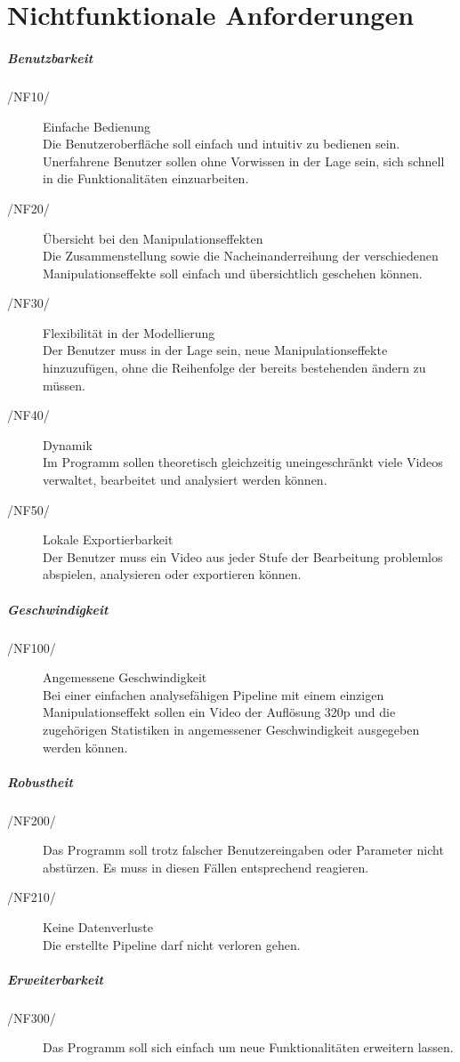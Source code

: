 \section{Nichtfunktionale Anforderungen}

\subparagraph{Benutzbarkeit}
\begin{description}
	\item[/NF10/] Einfache Bedienung \\ Die Benutzeroberfläche soll einfach und intuitiv zu bedienen sein. Unerfahrene Benutzer sollen ohne Vorwissen in der Lage sein, sich schnell in die Funktionalitäten einzuarbeiten.
	\item[/NF20/] Übersicht bei den Manipulationseffekten \\ Die Zusammenstellung sowie die Nacheinanderreihung der verschiedenen Manipulationseffekte soll einfach und übersichtlich geschehen können. 
	\item[/NF30/] Flexibilität in der Modellierung \\ Der Benutzer muss in der Lage sein, neue Manipulationseffekte hinzuzufügen, ohne die Reihenfolge der bereits bestehenden ändern zu müssen.
	\item[/NF40/] Dynamik \\ Im Programm sollen theoretisch gleichzeitig uneingeschränkt viele Videos verwaltet, bearbeitet und analysiert werden können.
	\item[/NF50/] Lokale Exportierbarkeit  \\ Der Benutzer muss ein Video aus jeder Stufe der Bearbeitung problemlos abspielen, analysieren oder exportieren können.
\end{description}

\subparagraph{Geschwindigkeit}

\begin{description}
	\item[/NF100/] Angemessene Geschwindigkeit \\ Bei einer einfachen analysefähigen Pipeline mit einem einzigen Manipulationseffekt sollen ein Video der Auflösung 320p und die zugehörigen Statistiken in angemessener Geschwindigkeit
 ausgegeben werden können.
\end{description}

\subparagraph{Robustheit}

\begin{description}
	\item[/NF200/] Das Programm soll trotz falscher Benutzereingaben oder Parameter nicht abstürzen. Es muss in diesen Fällen entsprechend reagieren.
	\item[/NF210/] Keine Datenverluste \\ Die erstellte Pipeline darf nicht verloren gehen.

\end{description}

\subparagraph{Erweiterbarkeit}

\begin{description}
	\item[/NF300/] Das Programm soll sich einfach um neue Funktionalitäten erweitern lassen.
\end{description}
